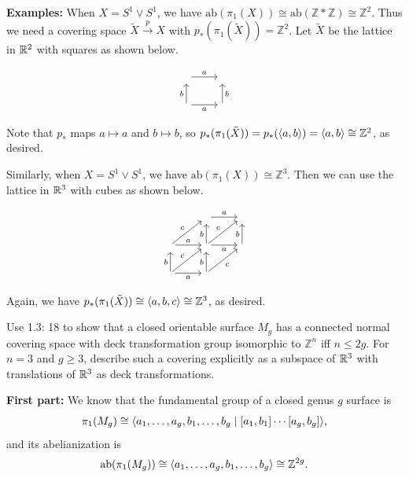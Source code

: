 \documentclass[twoside,10pt]{article}
\begin{document}
\textbf{Examples:} When $X = S^{1}\vee S^{1}$, we have $\text{ab}(\pi_1(X)) \cong \text{ab}(\mathbb{Z} * \mathbb{Z}) \cong \mathbb{Z}^2$. Thus we need a covering space $\tilde{X} \stackrel{p}{\to } X$ with $p_{*}(\pi_1(\tilde{X})) = \mathbb{Z}^{2}$. Let $\tilde{X}$ be the lattice in $\mathbb{R}^{2}$ with squares as shown below.

\[
\begin{tikzcd}
	{} \arrow[r, "a"]                 & {}                \\
{} \arrow[r, "a"'] \arrow[u, "b"] & {} \arrow[u, "b"']
\end{tikzcd}
\] 

Note that $p_{*}$ maps $a \mapsto a$ and $b \mapsto b$, so $p_{*}(\pi_1(\tilde{X})) = p_*(\langle a,b \rangle) = \langle a,b \rangle \cong \mathbb{Z}^{2}$, as desired.

Similarly, when $X= S^{1}\vee S^{1}$, we have $\text{ab}(\pi_1(X)) \cong \mathbb{Z}^{3}$. Then we can use the lattice in $\mathbb{R}^{3}$ with cubes as shown below.

\[
\begin{tikzcd}
                                                  & {} \arrow[r, "a"]                                 & {}                \\
{} \arrow[r, "a"] \arrow[ru, "c"]                 & {} \arrow[ru, "c"] \arrow[u, "b"] \arrow[r, "a"'] & {} \arrow[u, "b"] \\
{} \arrow[r, "a"'] \arrow[u, "b"] \arrow[ru, "c"] & {} \arrow[u, "b"] \arrow[ru, "c"']                &                  
\end{tikzcd}
\] 


Again, we have $p_{*}(\pi_1(\tilde{X})) \cong \langle a,b,c \rangle\cong \mathbb{Z}^{3}$, as desired.

\newpage

\begin{exer}[1.3: 19]
Use 1.3: 18 to show that a closed orientable surface $M_{g}$ has a connected normal covering space with deck transformation group isomorphic to $\mathbb{Z}^{n}$ iff $n \leq 2g$. For $n=3$ and $g \geq 3$, describe such a covering explicitly as a subspace of $\mathbb{R}^{3}$ with translations of $\mathbb{R}^{3}$ as deck transformations.
\end{exer}

\textbf{First part:} We know that the fundamental group of a closed genus $g$ surface is
\[
	\pi_1(M_{g}) \cong \langle a_1, \dots, a_g, b_1, \dots, b_g \;|\; [a_1,b_1] \cdots [a_g,b_g]  \rangle,
\] and its abelianization is
\[
	\text{ab}(\pi_1(M_{g})) \cong \langle a_1, \dots, a_g, b_1, \dots, b_g \rangle \cong \mathbb{Z}^{2g}.
\] 
\end{document}
